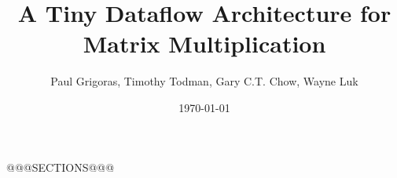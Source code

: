 \documentclass[a4paper]{article}
\begin{document}
\title{\textbf{A Tiny Dataflow Architecture for Matrix Multiplication}}
\author{Paul Grigoras, Timothy Todman, Gary C.T. Chow, Wayne Luk}
\date{\today}
\maketitle

@@@SECTIONS@@@



\end{document}
